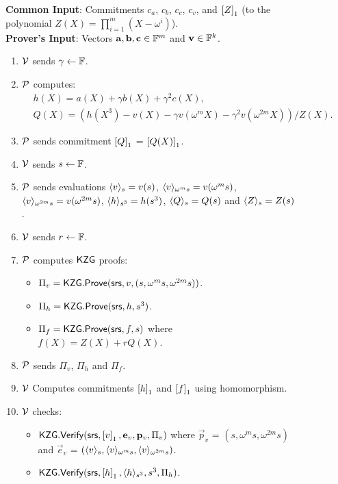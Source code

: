 \begin{figure}[htbp]
	\begin{mdframed}
		{
			{\bf Common Input}: Commitments $c_a$, $c_b$, $c_c$, $c_v$, and $\gone{Z}$ (to the polynomial
			$Z(X)=\prod_{i=1}^m (X-\omega^i)$). \\
			{\bf Prover's Input}: Vectors $\vec{a},\vec{b},\vec{c}\in\F^m$ and $\vec{v}\in \F^k$.
			\begin{enumerate}[leftmargin=1em, label=\arabic*.]
				\item $\verifier$ sends $\gamma\gets \F$.
				\item $\prover$ computes:
				\begin{align}
					& h(X) = a(X) + \gamma b(X) + \gamma^2 c(X),\\
					& Q(X) = (h(X^3) - v(X) - \gamma v(\omega^m X) - \gamma^2 v(\omega^{2m} X))/Z(X).
				\end{align}
				\item $\prover$ sends commitment $\gone{Q}$ = $\gone{Q(X)}$.
				\item $\verifier$ sends $s\gets\F$.
				\item $\prover$ sends evaluations $\val{s}{v}=v(s)$, $\val{\omega^m s}{v}=v(\omega^m s)$,
				$\val{\omega^{2m}s}{v}=v(\omega^{2m} s)$, $\val{s^3}{h}=h(s^3)$, $\val{s}{Q}=Q(s)$ and $\val{s}{Z}=Z(s)$.
				\item $\verifier$ sends $r\gets\F$.
				\item $\prover$ computes $\kzg$ proofs:
				\begin{itemize}[leftmargin=1em]
					\item $\Pi_v=\kzgprove(\srs,v,(s,\omega^m s, \omega^{2m}s))$.
					\item $\Pi_h=\kzgprove(\srs,h,s^3)$.
					\item $\Pi_f=\kzgprove(\srs,f,s)$ where $f(X)=Z(X) + rQ(X)$.
				\end{itemize}
				\item $\prover$ sends $\Pi_v$, $\Pi_h$ and $\Pi_f$.
				\item $\verifier$ Computes commitments $\gone{h}$ and $\gone{f}$ using homomorphism.
				\item $\verifier$ checks:
				\begin{itemize}[leftmargin=1em]
					\item $\kzgverify(\srs,\gone{v}, \vec{e}_v, \vec{p}_v, \Pi_v)$ where
					$\vec{p}_v$ = $(s,\omega^m s, \omega^{2m}s)$ and $\vec{e}_v$ = $(\val{s}{v}, \val{\omega^m s}{v}, \val{\omega^{2m} s}{v})$.
					\item $\kzgverify(\srs,\gone{h},  \val{s^3}{h}, s^3,\Pi_h)$.

\end{itemize}
\end{enumerate}}
\end{mdframed}
\end{figure}
